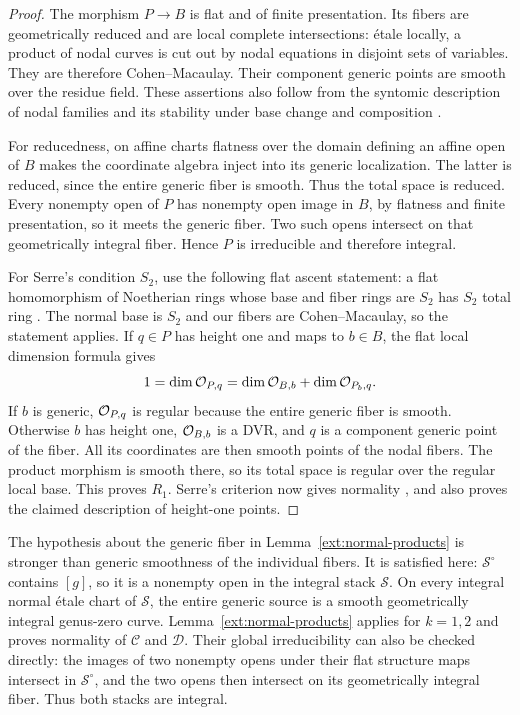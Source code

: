 \begin{proof}
The morphism $P\to B$ is flat and of finite presentation. Its fibers
are geometrically reduced and are local complete intersections:
\'etale locally, a product of nodal curves is cut out by nodal
equations in disjoint sets of variables. They are therefore
Cohen--Macaulay. Their component generic points are smooth over the
residue field. These assertions also follow from the syntomic
description of nodal families and its stability under base change
and composition \cite[Tags , , and ]{Stacks}.

For reducedness, on affine charts flatness over the domain defining
an affine open of $B$ makes the coordinate algebra inject into its
generic localization. The latter is reduced, since the entire
generic fiber is smooth. Thus the total space is reduced.
Every nonempty open of $P$ has nonempty open image in $B$, by
flatness and finite presentation, so it meets the generic fiber.
Two such opens intersect on that geometrically integral fiber.
Hence $P$ is irreducible and therefore integral.

For Serre's condition $S_2$, use the following flat ascent statement:
a flat homomorphism of Noetherian rings whose base and fiber rings
are $S_2$ has $S_2$ total ring
\cite[Lemma~10.163.4, Tag ]{Stacks}. The normal base is $S_2$
and our fibers are Cohen--Macaulay, so the statement applies.
If $q\in P$ has height one and maps to $b\in B$, the flat local
dimension formula \cite[Tag ]{Stacks} gives
\[
1=\dim\mathcal O_{P,q}
 =\dim\mathcal O_{B,b}+\dim\mathcal O_{P_b,q}.
\]
If $b$ is generic, $\mathcal O_{P,q}$ is regular because the entire
generic fiber is smooth. Otherwise $b$ has height one,
$\mathcal O_{B,b}$ is a DVR, and $q$ is a component generic point of the
fiber. All its coordinates are then smooth points of the nodal
fibers. The product morphism is smooth there, so its total space is
regular over the regular local base. This proves $R_1$.
Serre's criterion now gives normality
\cite[Tag ]{Stacks}, and also proves the claimed description of
height-one points.
\end{proof}

The hypothesis about the generic fiber in
Lemma~\ref{ext:normal-products} is stronger than generic smoothness
of the individual fibers. It is satisfied here: $\mathcal S^\circ$ contains $[g]$, so it is a nonempty open
in the integral stack $\mathcal S$. On every integral normal \'etale chart of $\mathcal S$, the
entire generic source is a smooth geometrically integral genus-zero
curve. Lemma~\ref{ext:normal-products} applies for $k=1,2$ and proves normality of
$\mathcal C$ and $\mathcal D$. Their global irreducibility can also
be checked directly: the images of two nonempty opens under their
flat structure maps intersect in $\mathcal S^\circ$, and the two
opens then intersect on its geometrically integral fiber. Thus both
stacks are integral.

